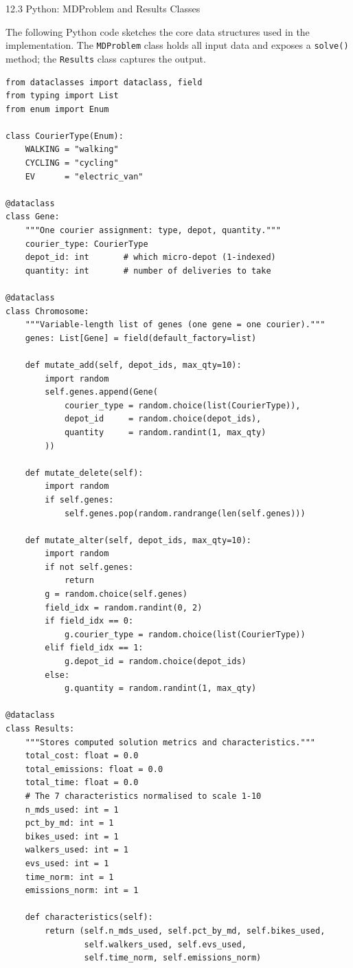 \documentclass[aspectratio=169,10pt]{beamer}
\begin{document}
\begin{frame}[fragile]{12.3 Python: MDProblem and Results Classes}

The following Python code sketches the core data structures
used in the implementation.
The \texttt{MDProblem} class holds all input data and
exposes a \texttt{solve()} method;
the \texttt{Results} class captures the output.

\begin{lstlisting}[caption={Core data structures (illustrative)}]
from dataclasses import dataclass, field
from typing import List
from enum import Enum

class CourierType(Enum):
    WALKING = "walking"
    CYCLING = "cycling"
    EV      = "electric_van"

@dataclass
class Gene:
    """One courier assignment: type, depot, quantity."""
    courier_type: CourierType
    depot_id: int       # which micro-depot (1-indexed)
    quantity: int       # number of deliveries to take

@dataclass
class Chromosome:
    """Variable-length list of genes (one gene = one courier)."""
    genes: List[Gene] = field(default_factory=list)

    def mutate_add(self, depot_ids, max_qty=10):
        import random
        self.genes.append(Gene(
            courier_type = random.choice(list(CourierType)),
            depot_id     = random.choice(depot_ids),
            quantity     = random.randint(1, max_qty)
        ))

    def mutate_delete(self):
        import random
        if self.genes:
            self.genes.pop(random.randrange(len(self.genes)))

    def mutate_alter(self, depot_ids, max_qty=10):
        import random
        if not self.genes:
            return
        g = random.choice(self.genes)
        field_idx = random.randint(0, 2)
        if field_idx == 0:
            g.courier_type = random.choice(list(CourierType))
        elif field_idx == 1:
            g.depot_id = random.choice(depot_ids)
        else:
            g.quantity = random.randint(1, max_qty)

@dataclass
class Results:
    """Stores computed solution metrics and characteristics."""
    total_cost: float = 0.0
    total_emissions: float = 0.0
    total_time: float = 0.0
    # The 7 characteristics normalised to scale 1-10
    n_mds_used: int = 1
    pct_by_md: int = 1
    bikes_used: int = 1
    walkers_used: int = 1
    evs_used: int = 1
    time_norm: int = 1
    emissions_norm: int = 1

    def characteristics(self):
        return (self.n_mds_used, self.pct_by_md, self.bikes_used,
                self.walkers_used, self.evs_used,
                self.time_norm, self.emissions_norm)
\end{lstlisting}

\end{frame}
\end{document}
